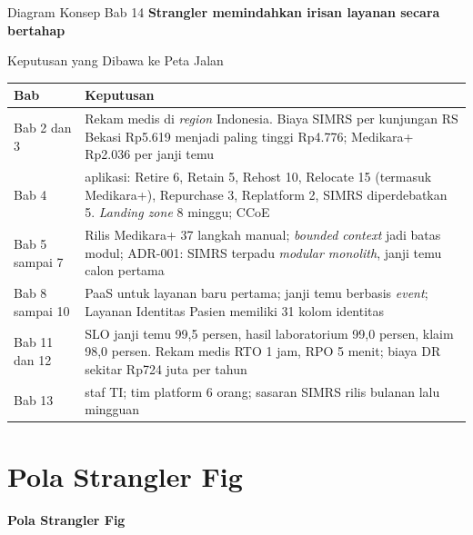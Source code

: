 \documentclass[aspectratio=169, table, 12pt]{beamer}
\begin{document}
\begin{frame}{{\Large Diagram Konsep Bab 14}}
  \centering
  {\small\bfseries Strangler memindahkan irisan layanan secara bertahap}\par\medskip
\end{frame}

\begin{frame}{{\Large Keputusan yang Dibawa ke Peta Jalan}}
  \footnotesize
  \begin{tabularx}{\textwidth}{>{\raggedright\arraybackslash}p{1.5cm}
      >{\raggedright\arraybackslash}X}
    \hline
    \textbf{Bab} & \textbf{Keputusan} \\ \hline
    Bab 2 dan 3 & Rekam medis di \textit{region} Indonesia. Biaya SIMRS per kunjungan RS Bekasi
      Rp5.619 menjadi paling tinggi Rp4.776; Medikara+ Rp2.036 per janji temu \\ \hline
    Bab 4 & 46 aplikasi: Retire 6, Retain 5, Rehost 10, Relocate 15 (termasuk Medikara+), Repurchase
      3, Replatform 2, SIMRS diperdebatkan 5. \textit{Landing zone} 8 minggu; CCoE \\ \hline
    Bab 5 sampai 7 & Rilis Medikara+ 37 langkah manual; \textit{bounded context} jadi batas modul;
      ADR-001: SIMRS terpadu \textit{modular monolith}, janji temu calon pertama \\ \hline
    Bab 8 sampai 10 & PaaS untuk layanan baru pertama; janji temu berbasis \textit{event}; Layanan
      Identitas Pasien memiliki 31 kolom identitas \\ \hline
    Bab 11 dan 12 & SLO janji temu 99,5 persen, hasil laboratorium 99,0 persen, klaim 98,0 persen.
      Rekam medis RTO 1 jam, RPO 5 menit; biaya DR sekitar Rp724 juta per tahun \\ \hline
    Bab 13 & 52 staf TI; tim platform 6 orang; sasaran SIMRS rilis bulanan lalu mingguan \\ \hline
  \end{tabularx}
\end{frame}

\section{Pola Strangler Fig}

\begin{frame}{\hfill}
  \centering
  \Huge{\textbf{Pola Strangler Fig}}
\end{frame}
\end{document}
